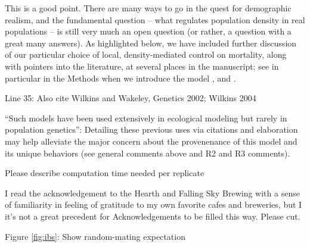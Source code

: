 This is a good point. There are many ways to go in the quest for demographic realism,
and the fundamental question -- what regulates population density in real populations --
is still very much an open question (or rather, a question with a great many answers).
As highlighted below,
we have included further discussion of our particular choice
of local, density-mediated control on mortality,
along with pointers into the literature, at several places in the manuscript;
see in particular in the Methods when we introduce the model ,
and .

\begin{point}{Line 35:}
    Also cite Wilkins and Wakeley, Genetics 2002; Wilkins 2004
\end{point}


\begin{point}{\revref}
    ``Such models have been used extensively in ecological modeling but rarely in population genetics'': Detailing these previous uses via citations and elaboration may help alleviate the major concern about the provenenance of this model and its unique behaviors (see general comments above and R2 and R3 comments).
\end{point}


\begin{point}{\revref}
    Please describe computation time needed per replicate
\end{point}


\begin{point}{\revref}
    I read the acknowledgement to the Hearth and Falling Sky Brewing with a sense of familiarity in feeling of gratitude to my own favorite cafes and breweries, but I it's not a great precedent for Acknowledgements to be filled this way. Please cut.
\end{point}


\begin{point}{Figure \ref{fig:ibs}:}
    Show random-mating expectation
\end{point}

